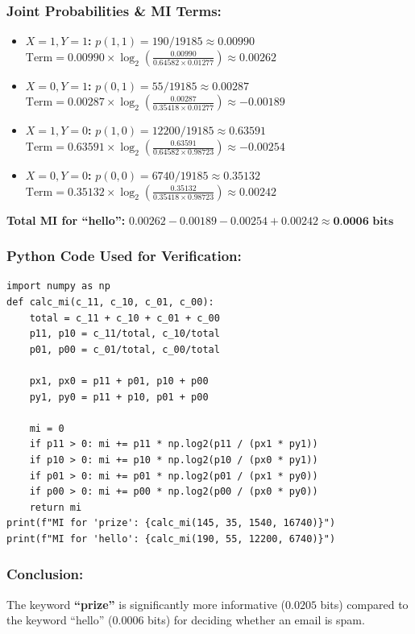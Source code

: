 \documentclass[twoside, 10pt]{article}
\begin{document}
\subsubsection{Joint Probabilities \& MI Terms:}
\begin{itemize}
    \item \textbf{$X=1, Y=1$:} $p(1,1) = 190 / 19185 \approx 0.00990$ \\
    $\text{Term} = 0.00990 \times \log_2 \left( \frac{0.00990}{0.64582 \times 0.01277} \right) \approx 0.00262$
    \item \textbf{$X=0, Y=1$:} $p(0,1) = 55 / 19185 \approx 0.00287$ \\
    $\text{Term} = 0.00287 \times \log_2 \left( \frac{0.00287}{0.35418 \times 0.01277} \right) \approx -0.00189$
    \item \textbf{$X=1, Y=0$:} $p(1,0) = 12200 / 19185 \approx 0.63591$ \\
    $\text{Term} = 0.63591 \times \log_2 \left( \frac{0.63591}{0.64582 \times 0.98723} \right) \approx -0.00254$
    \item \textbf{$X=0, Y=0$:} $p(0,0) = 6740 / 19185 \approx 0.35132$ \\
    $\text{Term} = 0.35132 \times \log_2 \left( \frac{0.35132}{0.35418 \times 0.98723} \right) \approx 0.00242$
\end{itemize}
\textbf{Total MI for ``hello'':} $0.00262 - 0.00189 - 0.00254 + 0.00242 \approx \textbf{0.0006 bits}$
\subsubsection{Python Code Used for Verification:}
\begin{lstlisting}
import numpy as np
def calc_mi(c_11, c_10, c_01, c_00):
    total = c_11 + c_10 + c_01 + c_00
    p11, p10 = c_11/total, c_10/total
    p01, p00 = c_01/total, c_00/total
    
    px1, px0 = p11 + p01, p10 + p00
    py1, py0 = p11 + p10, p01 + p00
    
    mi = 0
    if p11 > 0: mi += p11 * np.log2(p11 / (px1 * py1))
    if p10 > 0: mi += p10 * np.log2(p10 / (px0 * py1))
    if p01 > 0: mi += p01 * np.log2(p01 / (px1 * py0))
    if p00 > 0: mi += p00 * np.log2(p00 / (px0 * py0))
    return mi
print(f"MI for 'prize': {calc_mi(145, 35, 1540, 16740)}")
print(f"MI for 'hello': {calc_mi(190, 55, 12200, 6740)}")
\end{lstlisting}
\subsubsection{Conclusion:}
The keyword \textbf{``prize''} is significantly more informative ($0.0205$ bits) compared to the keyword ``hello'' ($0.0006$ bits) for deciding whether an email is spam.
\end{document}
